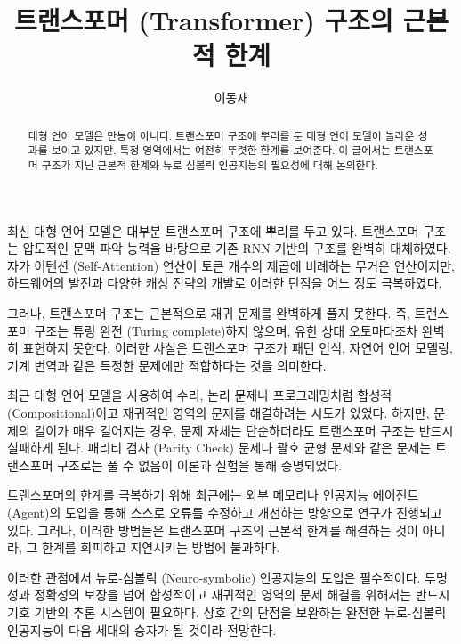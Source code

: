 \documentclass[11pt, oneside]{article}   	%
\title{트랜스포머 (Transformer) 구조의 근본적 한계}
\author{이동재}
\date{}
\begin{document}
\maketitle


\begin{abstract}
  대형 언어 모델은 만능이 아니다. 트랜스포머 구조에 뿌리를 둔 대형 언어 모델이 놀라운 성과를 보이고 있지만, 특정 영역에서는 여전히 뚜렷한 한계를 보여준다. 이 글에서는 트랜스포머 구조가 지닌 근본적 한계와 뉴로-심볼릭 인공지능의 필요성에 대해 논의한다.
\end{abstract}
최신 대형 언어 모델은 대부분 트랜스포머 구조에 뿌리를 두고 있다. 트랜스포머 구조는 압도적인 문맥 파악 능력을 바탕으로 기존 RNN 기반의 구조를 완벽히 대체하였다. 자가 어텐션 (Self-Attention) 연산이 토큰 개수의 제곱에 비례하는 무거운 연산이지만, 하드웨어의 발전과 다양한 캐싱 전략의 개발로 이러한 단점을 어느 정도 극복하였다.

그러나, 트랜스포머 구조는 근본적으로 재귀 문제를 완벽하게 풀지 못한다. 즉, 트랜스포머 구조는 튜링 완전 (Turing complete)하지 않으며, 유한 상태 오토마타조차 완벽히 표현하지 못한다. 이러한 사실은 트랜스포머 구조가 패턴 인식, 자연어 언어 모델링, 기계 번역과 같은 특정한 문제에만 적합하다는 것을 의미한다.

최근 대형 언어 모델을 사용하여 수리, 논리 문제나 프로그래밍처럼 합성적 (Compositional)이고 재귀적인 영역의 문제를 해결하려는 시도가 있었다. 하지만, 문제의 길이가 매우 길어지는 경우, 문제 자체는 단순하더라도 트랜스포머 구조는 반드시 실패하게 된다. 패리티 검사 (Parity Check) 문제나 괄호 균형 문제와 같은 문제는 트랜스포머 구조로는 풀 수 없음이 이론과 실험을 통해 증명되었다.

트랜스포머의 한계를 극복하기 위해 최근에는 외부 메모리나 인공지능 에이전트 (Agent)의 도입을 통해 스스로 오류를 수정하고 개선하는 방향으로 연구가 진행되고 있다. 그러나, 이러한 방법들은 트랜스포머 구조의 근본적 한계를 해결하는 것이 아니라, 그 한계를 회피하고 지연시키는 방법에 불과하다.

이러한 관점에서 뉴로-심볼릭 (Neuro-symbolic) 인공지능의 도입은 필수적이다. 투명성과 정확성의 보장을 넘어 합성적이고 재귀적인 영역의 문제 해결을 위해서는 반드시 기호 기반의 추론 시스템이 필요하다. 상호 간의 단점을 보완하는 완전한 뉴로-심볼릭 인공지능이 다음 세대의 승자가 될 것이라 전망한다.
\end{document}
